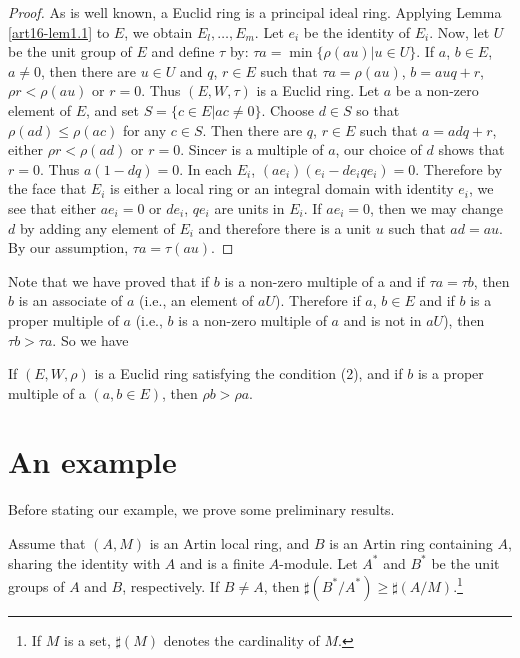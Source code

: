 \begin{proof}
As is well known, a Euclid ring is a principal ideal ring. Applying Lemma \ref{art16-lem1.1} to $E$, we obtain $E_l, \ldots, E_m$. Let $e_i$ be the identity of $E_i$. Now, let $U$ be the unit group of $E$ and define $\tau$ by: $\tau a =\min \{\rho (a u)| u \in U\}$. If $a$, $b \in E$, $a \neq 0$, then there are $u \in U$ and $q$, $r \in E$ such that $\tau a = \rho (a u)$, $b = auq +r$, $\rho r < \rho (au)$ or $r=0$. Thus $(E, W, \tau)$ is a Euclid ring. Let $a$ be a non-zero element of $E$, and set $S = \{c \in E | a c \neq 0\}$. Choose $d \in S$ so that $\rho(ad) \leqslant \rho (ac)$ for any $c \in S$. Then there are $q$, $r \in E$ such that $a = a dq+r$, either $\rho r < \rho (ad)$ or $r =0$.
Since\pageoriginale $r$ is a multiple of $a$, our choice of $d$ shows that $r=0$. Thus $a(1-dq) =0$. In each $E_i$, $(ae_i) (e_i - de_i qe_i) =0$. Therefore by the face that $E_i$ is either a local ring or an integral domain with identity $e_i$, we see that either $ae_i =0$ or $de_i$, $qe_i$ are units in $E_i$. If $ae_i=0$, then we may change $d$ by adding any element of $E_i$ and therefore there is a unit $u$ such that $ad = au$. By our assumption, $\tau a = \tau (a u)$. 
\end{proof}

Note that we have proved that if $b$ is a non-zero multiple of a and if $\tau a = \tau b$, then $b$ is an associate of $a$ (i.e., an element of $aU$). Therefore if $a$, $b \in E$ and if $b$ is a proper multiple of $a$ (i.e., $b$ is a non-zero multiple of $a$ and is not in $aU$), then $\tau b > \tau a$. So we have

\begin{corollary}\label{art16-coro1.3}
If $(E, W, \rho)$ is a Euclid ring satisfying the condition (2), and if $b$ is a proper multiple of a $(a, b \in E)$, then $\rho b > \rho a$.
\end{corollary}

\section{An example}\label{art16-sec2}
Before stating our example, we prove some preliminary results.

\begin{lemma}\label{art16-lem2.1}
Assume that $(A,M)$ is an Artin local ring, and $B$ is an Artin ring containing $A$, sharing the identity with $A$
 and is a finite $A$-module. Let $A^*$ and $B^*$ be the unit groups of $A$ and $B$, respectively. If $B \neq A$, then $\sharp (B^*/A^*) \geqslant \sharp (A/M)$.\footnote{If $M$ is a set, $\sharp (M)$ denotes the cardinality of $M$.}
\end{lemma}

